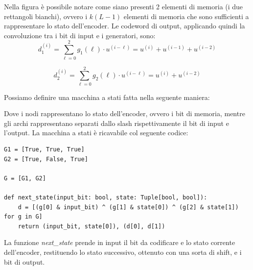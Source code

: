 Nella figura è possibile notare come siano presenti 2 elementi di memoria (i due rettangoli bianchi), ovvero i $k(L-1)$ elementi di memoria che sono sufficienti a rappresentare lo stato dell'encoder.
Le codeword di output, applicando quindi la convoluzione tra i bit di input e i generatori, sono:
\[
    d_1^{\left(i\right)} = \sum_{\ell=0}^{2} g_1\left(\ell\right) \cdot u^{\left( i - \ell \right)} = u^{\left(i\right)} + u^{\left(i-1\right)} + u^{\left(i-2\right)}
\]

\[
    d_2^{\left(i\right)} = \sum_{\ell=0}^{2} g_2\left(\ell\right) \cdot u^{\left( i - \ell \right)} = u^{\left(i\right)} + u^{\left(i-2\right)}
\]

Possiamo definire una macchina a stati fatta nella seguente maniera:

\begin{center}
\end{center}


Dove i nodi rappresentano lo stato dell'encoder, ovvero i bit di memoria, mentre gli archi rappresentano separati dallo slash rispettivamente il bit di input e l'output.
La macchina a stati è ricavabile col seguente codice:

\begin{verbatim}
G1 = [True, True, True]
G2 = [True, False, True]

G = [G1, G2]

def next_state(input_bit: bool, state: Tuple[bool, bool]):
    d = [(g[0] & input_bit) ^ (g[1] & state[0]) ^ (g[2] & state[1]) for g in G]
    return (input_bit, state[0]), (d[0], d[1])
\end{verbatim}

La funzione \textit{next\_state} prende in input il bit da codificare e lo stato corrente dell'encoder, restituendo lo stato successivo, ottenuto con una sorta di shift, e i bit di output.

